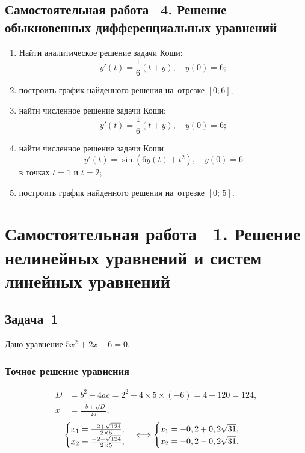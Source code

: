 \documentclass[10pt, a4paper, titlepage]{article}
\begin{document}
\subsection*{Самостоятельная работа \textnumero~4. Решение обыкновенных дифференциальных уравнений}

\begin{enumerate}
    \item Найти аналитическое решение задачи Коши: $$y'(t)=\frac{1}{6}(t+y), \quad y(0)=6 ;$$
    \item построить график найденного решения на~отрезке $[0; 6]$;
    \item найти численное решение задачи Коши: $$y'(t)=\frac{1}{6}(t+y), \quad y(0)=6 ;$$
    \item найти численное решение задачи Коши $$y'(t)=\sin(6y(t)+t^2), \quad y(0)=6$$ в точках $t=1$ и $t=2$;
    \item построить график найденного решения на~отрезке $[0;\,5]$.
\end{enumerate}

\clearpage
\section{Самостоятельная работа \textnumero~1. Решение нелинейных уравнений и систем линейных уравнений}

\subsection{Задача~1}

Дано уравнение $5x^2+2x-6=0$.

\subsubsection*{Точное решение уравнения}

\begin{align*}
D &= b^2-4ac=2^2-4\times5\times(-6)=4+120=124, \\
x &= \frac{-b\pm\sqrt{D}}{2a},
\end{align*}
\begin{equation*}
    \begin{cases}
        $$x_1=\frac{-2+\sqrt{124}}{2\times5}$$, \\
        $$x_2=\frac{-2-\sqrt{124}}{2\times5}$$,
    \end{cases}
    \Longleftrightarrow
    \begin{cases}
        $$x_1=-0,2+0,2\sqrt{31}$$, \\
        $$x_2=-0,2-0,2\sqrt{31}$$.
    \end{cases}
\end{equation*} 
\end{document}

